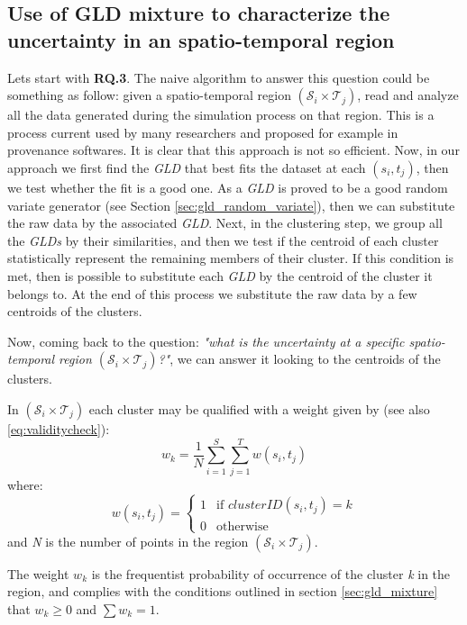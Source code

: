 \subsection{Use of GLD mixture to characterize the uncertainty in an spatio-temporal region}
\label{sub:gldMixtureWorkflow}
Lets start with \textbf{RQ.3}. The naive algorithm to answer this question could be something as follow: given a spatio-temporal region $(\mathcal{S}_{i} \times \mathcal{T}_{j})$, read and analyze all the data generated during the simulation process on that region. This is a process current used by many researchers and proposed for example in provenance softwares. It is clear that this approach is not so efficient. Now, in our approach we first find the \textit{GLD} that best fits the dataset at each $(s_{i},t_{j})$, then we test whether the fit is a good one. As a \textit{GLD} is proved to be a good random variate generator (see Section \ref{sec:gld_random_variate}), then we can substitute the raw data by the associated \textit{GLD}. Next, in the clustering step, we group all the \textit{GLDs} by their similarities, and then we test if the centroid of each cluster statistically represent the remaining members of their cluster. If this condition is met, then is possible to substitute each \textit{GLD} by the centroid of the cluster it belongs to. At the end of this process we substitute the raw data by a few centroids of the clusters.
  
Now, coming back to the question: \textit{"what is the uncertainty at a specific spatio-temporal region $(\mathcal{S}_{i} \times \mathcal{T}_{j})$?"}, we can answer it looking to the centroids of the clusters.

In $(\mathcal{S}_{i} \times \mathcal{T}_{j})$ each cluster may be qualified with a weight given by (see also \ref{eq:validitycheck}):
\begin{equation}
w_{k}=\frac{1}{N}\sum_{i=1}^S \sum_{j=1}^T w(s_{i},t_{j})
\end{equation}
where:
\begin{equation}
  w(s_{i},t_{j}) =
  \begin{cases}
    1 & \text{if $clusterID(s_{i},t_{j}) = k$} \\
    0 & \text{otherwise}
  \end{cases}
\end{equation}
and  \textit{N} is the number of points in the region $(\mathcal{S}_{i} \times \mathcal{T}_{j})$.

The weight $w_k$ is the frequentist probability of occurrence of the cluster \textit{k} in the region, and complies with the conditions outlined in section \ref{sec:gld_mixture} that $w_{k} \geq 0$ and $\sum w_{k}=1$.

